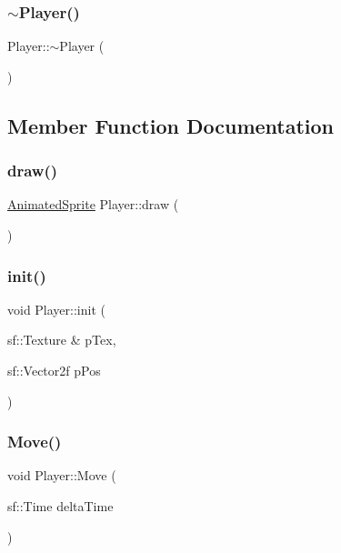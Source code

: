 \hypertarget{class_player_a749d2c00e1fe0f5c2746f7505a58c062}{}\label{class_player_a749d2c00e1fe0f5c2746f7505a58c062} 
\subsubsection{\texorpdfstring{$\sim$\+Player()}{~Player()}}
{\footnotesize\ttfamily Player\+::$\sim$\+Player (\begin{DoxyParamCaption}{ }\end{DoxyParamCaption})}



\subsection{Member Function Documentation}
\hypertarget{class_player_af9e361fd707a32d86ff1a0f75fb2c3b2}{}\label{class_player_af9e361fd707a32d86ff1a0f75fb2c3b2} 
\subsubsection{\texorpdfstring{draw()}{draw()}}
{\footnotesize\ttfamily \hyperlink{class_animated_sprite}{Animated\+Sprite} Player\+::draw (\begin{DoxyParamCaption}{ }\end{DoxyParamCaption})}

\hypertarget{class_player_a66ab1b1a0569de7d1e83350e939a1d40}{}\label{class_player_a66ab1b1a0569de7d1e83350e939a1d40} 
\subsubsection{\texorpdfstring{init()}{init()}}
{\footnotesize\ttfamily void Player\+::init (\begin{DoxyParamCaption}\item[{sf\+::\+Texture \&}]{p\+Tex,  }\item[{sf\+::\+Vector2f}]{p\+Pos }\end{DoxyParamCaption})}

\hypertarget{class_player_aab4ff61041f937e6c3d560863fa46f56}{}\label{class_player_aab4ff61041f937e6c3d560863fa46f56} 
\subsubsection{\texorpdfstring{Move()}{Move()}}
{\footnotesize\ttfamily void Player\+::\+Move (\begin{DoxyParamCaption}\item[{sf\+::\+Time}]{delta\+Time }\end{DoxyParamCaption})}


